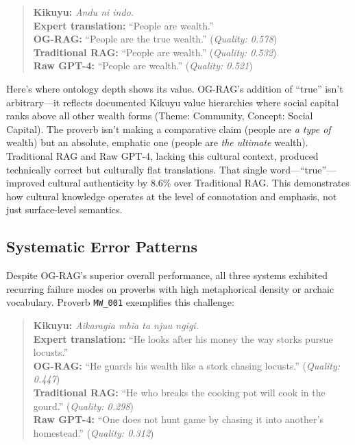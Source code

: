 \begin{quote}
\textbf{Kikuyu:} \emph{Andu ni indo.}\\
\textbf{Expert translation:} ``People are wealth.''\\
\textbf{OG-RAG:} ``People are the true wealth.'' (\textit{Quality: 0.578})\\
\textbf{Traditional RAG:} ``People are wealth.'' (\textit{Quality: 0.532})\\
\textbf{Raw GPT-4:} ``People are wealth.'' (\textit{Quality: 0.521})
\end{quote}

Here's where ontology depth shows its value. OG-RAG's addition of ``true'' isn't arbitrary—it reflects documented Kikuyu value hierarchies where social capital ranks above all other wealth forms (Theme: Community, Concept: Social Capital). The proverb isn't making a comparative claim (people are \emph{a type of} wealth) but an absolute, emphatic one (people are \emph{the ultimate} wealth). Traditional RAG and Raw GPT-4, lacking this cultural context, produced technically correct but culturally flat translations. That single word—``true''—improved cultural authenticity by 8.6\% over Traditional RAG. This demonstrates how cultural knowledge operates at the level of connotation and emphasis, not just surface-level semantics.

\subsection{Systematic Error Patterns}
\label{subsec:error_patterns}

Despite OG-RAG's superior overall performance, all three systems exhibited recurring failure modes on proverbs with high metaphorical density or archaic vocabulary. Proverb \texttt{MW\_001} exemplifies this challenge:

\begin{quote}
\textbf{Kikuyu:} \emph{Aikaragia mbia ta njuu ngigi.}\\
\textbf{Expert translation:} ``He looks after his money the way storks pursue locusts.''\\
\textbf{OG-RAG:} ``He guards his wealth like a stork chasing locusts.'' (\textit{Quality: 0.447})\\
\textbf{Traditional RAG:} ``He who breaks the cooking pot will cook in the gourd.'' (\textit{Quality: 0.298})\\
\textbf{Raw GPT-4:} ``One does not hunt game by chasing it into another's homestead.'' (\textit{Quality: 0.312})
\end{quote}

